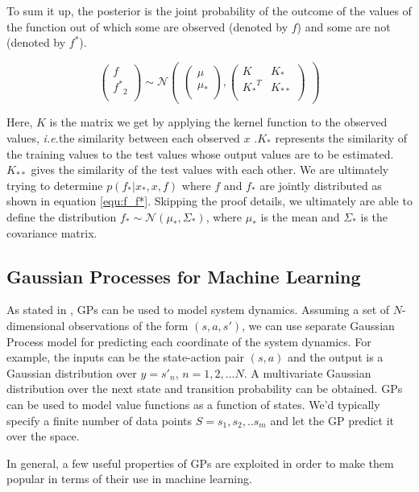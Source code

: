 \documentclass[12pt]{report}
\newcommand{\ie}{\textit{i.e.}}
\begin{document}
To sum it up, the posterior is the joint probability of the outcome of the values of the function out of which some are observed (denoted by $f$) and some are not (denoted by $f^*$). 

\begin{equation}
\label{equ:f_f*}
\begin{pmatrix}f\\
{f^*}_2\\
\end{pmatrix} 
\sim \mathcal{N}\begin{pmatrix} 
\begin{pmatrix}\mu\\
\mu_*\\
\end{pmatrix} ,\begin{pmatrix}K & K_*\\
{K_*}^T & K_{**}\\
\end{pmatrix} 
\end{pmatrix}
\end{equation}

Here, $K$ is the matrix we get by applying the kernel function to the observed values, \ie the similarity between each observed $x$ .$K_*$ represents the similarity of the training values to the test values whose output values are to be estimated. $K_{**}$ gives the similarity of the test values with each other. We are ultimately trying to determine $p(f_*|x_*,x,f)$ where $f$ and $f_*$ are jointly distributed as shown in equation \ref{equ:f_f*}. {\color{red}Skipping the proof details}, we ultimately are able to define the distribution $f_* \sim \mathcal{N} (\mu_*,\Sigma_*)$, where $\mu_*$ is the mean and $\Sigma_*$ is the covariance matrix.

\subsection{Gaussian Processes for Machine Learning}
As stated in \cite{rasmussen2003gaussian}, GPs can be used to model system dynamics. Assuming a set of $N$-dimensional observations of the form $(s,a,s')$, we can use separate Gaussian Process model for predicting each coordinate of the system dynamics. For example, the inputs can be the state-action pair $(s,a)$ and the output is a Gaussian distribution over $y = s'_n$, $n = 1,2,...N$. A multivariate Gaussian distribution over the next state and transition probability can be obtained. GPs can be used to model value functions as a function of states. We'd typically specify a finite number of data points $S=s_1,s_2,..s_m$ and let the GP predict it over the space. \par 
In general, a few useful properties of GPs are exploited in order to make them popular in terms of their use in machine learning.
\end{document}
